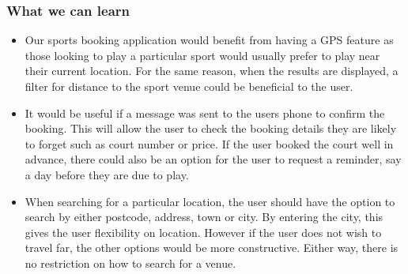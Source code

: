 \subsubsection{What we can learn}
\label{ssub:what_we_can_learn2}

\begin{itemize}
	\item Our sports booking application would benefit from having a GPS
		feature as those looking to play a particular sport would usually
		prefer to play near their current location. For the same reason, when
		the results are displayed, a filter for distance to the sport venue
		could be beneficial to the user.
	\item It would be useful if a message was sent to the users phone to
		confirm the booking. This will allow the user to check the booking
		details they are likely to forget such as court number or price. If the
		user booked the court well in advance, there could also be an option
		for the user to request  a reminder,  say a day before they are due to
		play.
	\item When searching for a particular location, the user should have the
		option to search by either postcode, address, town or city. By entering
		the city, this gives the user flexibility on location. However if the
		user does not wish to travel far, the other options would be more
		constructive. Either way, there is no restriction on how to search for
		a venue.
\end{itemize}
